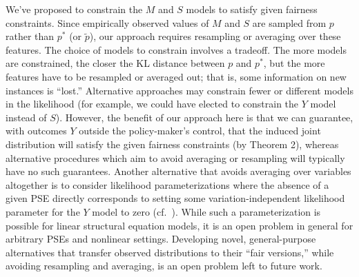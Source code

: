\documentclass{article}
\begin{document}
We've proposed to constrain the $M$ and $S$ models to satisfy given fairness constraints. Since empirically observed values of $M$ and $S$ are sampled from $p$ rather than $p^*$ (or $\tilde{p}$), our approach requires resampling or averaging over these features. The choice of models to constrain involves a tradeoff.  The more models are constrained, the closer the KL distance between $p$ and $p^*$, but the more features have to be resampled or averaged out; that is, some information on new instances is ``lost.'' Alternative approaches may constrain fewer or different models in the likelihood (for example, we could have elected to constrain the $Y$ model instead of $S$). However, the benefit of our approach here is that we can guarantee, with outcomes $Y$ outside the policy-maker's control, that the induced joint distribution will satisfy the given fairness constraints (by Theorem 2), whereas alternative procedures which aim to avoid averaging or resampling will typically have no such guarantees. Another alternative that avoids averaging over variables altogether is to consider likelihood parameterizations where the absence of a given PSE directly corresponds to setting some variation-independent likelihood parameter for the $Y$ model to zero (cf.\ \citet{chiappa2018path}). While such a parameterization is possible for linear structural equation models, it is an open problem in general for arbitrary PSEs and nonlinear settings.
Developing novel, general-purpose alternatives that transfer observed distributions to their ``fair versions,'' while avoiding resampling and averaging, is an open problem left to future work.

\end{document}
